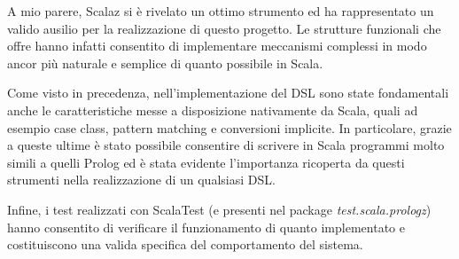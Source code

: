 A mio parere, Scalaz si è rivelato un ottimo strumento ed ha rappresentato un valido ausilio per la realizzazione di questo progetto. Le strutture funzionali che offre hanno infatti consentito di implementare meccanismi complessi in modo ancor più naturale e semplice di quanto possibile in Scala.

Come visto in precedenza, nell'implementazione del DSL sono state fondamentali anche le caratteristiche messe a disposizione nativamente da Scala, quali ad esempio case class, pattern matching e conversioni implicite. In particolare, grazie a queste ultime è stato possibile consentire di scrivere in Scala programmi molto simili a quelli Prolog ed è stata evidente l'importanza ricoperta da questi strumenti nella realizzazione di un qualsiasi DSL.

Infine, i test realizzati con ScalaTest (e presenti nel package \textit{test.scala.prologz}) hanno consentito di verificare il funzionamento di quanto implementato e costituiscono una valida specifica del comportamento del sistema.
